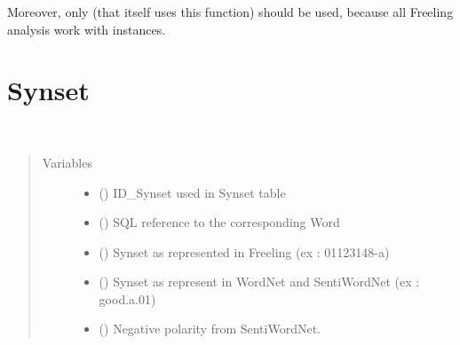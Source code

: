 \documentclass[letterpaper,10pt,english]{sphinxmanual}
\begin{document}
\begin{fulllineitems}
\begin{fulllineitems}
Moreover, only  (that itself uses this function) should be used,
because all Freeling analysis work with  instances.

\end{fulllineitems}


\end{fulllineitems}



\section{Synset}
\label{\detokenize{classes:synset}}

\begin{fulllineitems}
\label{\detokenize{classes:loacore.classes.classes.Synset}}~\begin{quote}\begin{description}
\item[{Variables}] \leavevmode\begin{itemize}
\item {} 
 () \textendash{} ID\_Synset used in Synset table

\item {} 
 () \textendash{} SQL reference to the corresponding Word

\item {} 
 () \textendash{} Synset as represented in Freeling (ex : 01123148-a)

\item {} 
 () \textendash{} Synset as represent in WordNet and SentiWordNet (ex : good.a.01)

\item {} 
 () \textendash{} Negative polarity from SentiWordNet.


\end{itemize}
\end{description}
\end{quote}
\end{fulllineitems}
\end{document}
